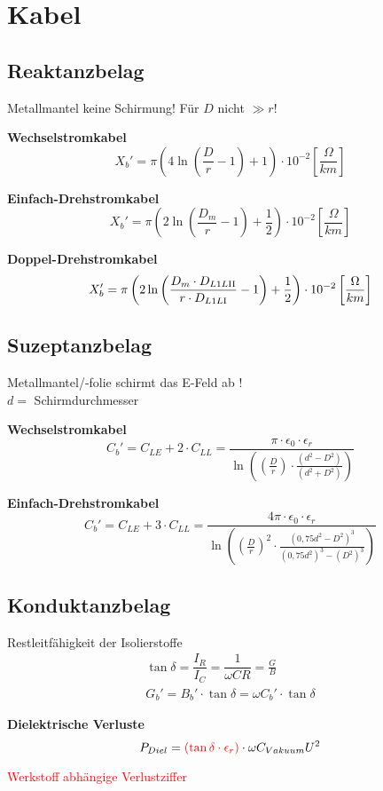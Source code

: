 \section{Kabel}

\subsection{Reaktanzbelag}
Metallmantel keine Schirmung! Für $D$ nicht $\gg r$!

\textbf{Wechselstromkabel}
\begin{equation*}
    X_{b}' = \pi \left( 4 \ln \left( \frac{D}{r} -1\right) +1 \right) \cdot 10 ^{-2}   \left[\frac{\Omega}{km}\right]
\end{equation*}

\textbf{Einfach-Drehstromkabel}
\begin{equation*}
    X_{b}' = \pi \left( 2 \ln \left( \frac{D_{m}}{r} -1\right) +\frac{1}{2} \right) \cdot 10 ^{-2}   \left[\frac{\Omega}{km}\right]
\end{equation*}

\textbf{Doppel-Drehstromkabel}
\begin{equation*}
    X_{b}' = \pi \left( 2 \ln \left( \frac{D_{m} \cdot D_{L1L\RN{2}}}{r \cdot D_{L1L\RN{1}}} -1\right) +\frac{1}{2} \right) \cdot 10 ^{-2}   \left[\frac{\Omega}{km}\right]
\end{equation*}


\subsection{Suzeptanzbelag}
Metallmantel/-folie schirmt das E-Feld ab !\\
$d =$ Schirmdurchmesser

\textbf{Wechselstromkabel}
\begin{equation*}
    C_{b}' = C_{LE} + 2 \cdot C_{LL} = \frac{\pi \cdot \epsilon_{0} \cdot \epsilon_{r}}{\ln \left( \left(\frac{D}{r}\right) \cdot \frac{(d^2 - D^2)}{(d^2 + D^2)} \right)}
\end{equation*}

\textbf{Einfach-Drehstromkabel}
\begin{equation*}
    C_{b}' = C_{LE} + 3 \cdot C_{LL} = \frac{4 \pi \cdot \epsilon_{0} \cdot \epsilon_{r}}{\ln \left( \left(\frac{D}{r}\right)^2 \cdot \frac{(0,75d^2 - D^2)^3}{(0,75d^2)^3 - (D^2)^3} \right)}
\end{equation*}


\subsection{Konduktanzbelag}
\textcolor{dgreen}{Restleitfähigkeit der Isolierstoffe}
\begin{gather*}
    \tan \delta = \dfrac{I_{R}}{I_{C}} = \dfrac{1}{\omega C R} = \frac{G}{B}\\
    G_{b}' = B_{b}' \cdot \tan \delta = \omega C_{b}' \cdot \tan \delta
\end{gather*}


\textbf{Dielektrische Verluste}
\begin{equation*}
    P_{Diel} = \textcolor{red}{(\tan \delta \cdot \epsilon_{r})} \cdot \omega C_{Vakuum} U^2
\end{equation*}

\textcolor{red}{Werkstoff abhängige Verlustziffer}